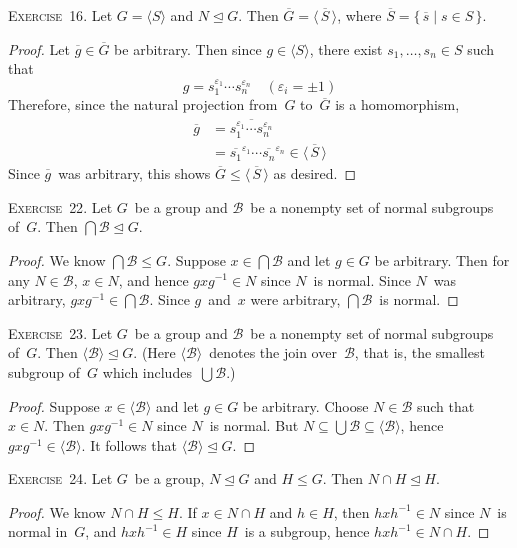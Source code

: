 \documentclass[letterpaper]{article}
\newcommand{\exercise}[1]{\goodbreak\noindent\textsc{Exercise~{#1}.}}
\newcommand{\B}{\mathcal{B}}
\newcommand{\bigunion}{\bigcup}
\newcommand{\sect}{\cap}
\newcommand{\bigsect}{\bigcap}
\newcommand{\subgroup}{\le}
\newcommand{\normal}{\trianglelefteq}
\newcommand{\res}[1]{\overline{#1}}
\newcommand{\gen}[1]{\langle{#1}\rangle}
\begin{document}
\exercise{16}
Let $G=\gen{S}$ and $N\normal G$. Then $\res{G}=\gen{\,\res{S}\,}$, where $\res{S}=\{\,\res{s}\mid s\in S\,\}$.
\begin{proof}
Let $\res{g}\in\res{G}$ be arbitrary. Then since $g\in\gen{S}$, there exist $s_1,\ldots,s_n\in S$ such that
$$g=s_1^{\varepsilon_1}\cdots s_n^{\varepsilon_n}\quad (\varepsilon_i=\pm1)$$
Therefore, since the natural projection from~$G$ to~$\res{G}$ is a homomorphism,
\begin{align*}
\res{g}&=\res{s_1^{\varepsilon_1}\cdots s_n^{\varepsilon_n}}\\
	&=\res{s_1}^{\varepsilon_1}\cdots\res{s_n}^{\varepsilon_n}\in\gen{\,\res{S}\,}
\end{align*}
Since $\res{g}$~was arbitrary, this shows $\res{G}\subgroup\gen{\,\res{S}\,}$ as desired.
\end{proof}

\exercise{22}
Let $G$~be a group and $\B$~be a nonempty set of normal subgroups of~$G$. Then $\bigsect\B\normal G$.
\begin{proof}
We know $\bigsect\B\subgroup G$. Suppose $x\in\bigsect\B$ and let $g\in G$ be arbitrary. Then for any $N\in\B$, $x\in N$, and hence $gxg^{-1}\in N$ since $N$~is normal. Since $N$~was arbitrary, $gxg^{-1}\in\bigsect\B$. Since $g$~and~$x$ were arbitrary, $\bigsect\B$~is normal.
\end{proof}

\exercise{23}
Let $G$~be a group and $\B$~be a nonempty set of normal subgroups of~$G$. Then $\gen{\B}\normal G$. (Here $\gen{\B}$~denotes the join over~$\B$, that is, the smallest subgroup of~$G$ which includes~$\bigunion\B$.)
\begin{proof}
Suppose $x\in\gen{\B}$ and let $g\in G$ be arbitrary. Choose $N\in\B$ such that $x\in N$. Then $gxg^{-1}\in N$ since $N$~is normal. But $N\subseteq\bigunion\B\subseteq\gen{\B}$, hence $gxg^{-1}\in\gen{\B}$. It follows that $\gen{\B}\normal G$.
\end{proof}

\exercise{24}
Let $G$~be a group, $N\normal G$ and $H\subgroup G$. Then $N\sect H\normal H$.
\begin{proof}
We know $N\sect H\subgroup H$. If $x\in N\sect H$ and $h\in H$, then $hxh^{-1}\in N$ since $N$~is normal in~$G$, and $hxh^{-1}\in H$ since $H$~is a subgroup, hence $hxh^{-1}\in N\sect H$.
\end{proof}
\end{document}
